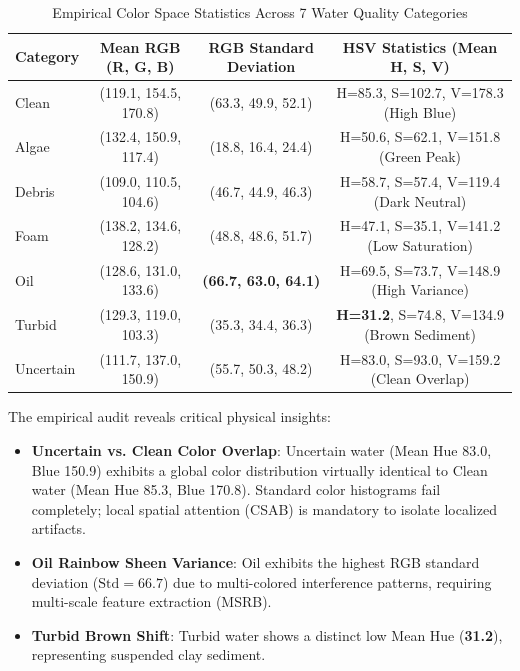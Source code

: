 \documentclass[journal]{IEEEtran}
\begin{document}
\begin{table}[!t]
\centering
\caption{Empirical Color Space Statistics Across 7 Water Quality Categories}
\label{tab:color_stats}
\begin{tabular}{lccc}
\toprule
\textbf{Category} & \textbf{Mean RGB (R, G, B)} & \textbf{RGB Standard Deviation} & \textbf{HSV Statistics (Mean H, S, V)} \\
\midrule
Clean & (119.1, 154.5, 170.8) & (63.3, 49.9, 52.1) & H=85.3, S=102.7, V=178.3 (High Blue) \\
Algae & (132.4, 150.9, 117.4) & (18.8, 16.4, 24.4) & H=50.6, S=62.1,  V=151.8 (Green Peak) \\
Debris & (109.0, 110.5, 104.6) & (46.7, 44.9, 46.3) & H=58.7, S=57.4,  V=119.4 (Dark Neutral) \\
Foam & (138.2, 134.6, 128.2) & (48.8, 48.6, 51.7) & H=47.1, S=35.1,  V=141.2 (Low Saturation) \\
Oil & (128.6, 131.0, 133.6) & \textbf{(66.7, 63.0, 64.1)} & H=69.5, S=73.7,  V=148.9 (High Variance) \\
Turbid & (129.3, 119.0, 103.3) & (35.3, 34.4, 36.3) & \textbf{H=31.2}, S=74.8,  V=134.9 (Brown Sediment) \\
Uncertain & (111.7, 137.0, 150.9) & (55.7, 50.3, 48.2) & H=83.0, S=93.0,  V=159.2 (Clean Overlap) \\
\bottomrule
\end{tabular}
\end{table}

The empirical audit reveals critical physical insights:
\begin{itemize}
    \item \textbf{\textsf{Uncertain} vs. \textsf{Clean} Color Overlap}: \textsf{Uncertain} water (Mean Hue 83.0, Blue 150.9) exhibits a global color distribution virtually identical to \textsf{Clean} water (Mean Hue 85.3, Blue 170.8). Standard color histograms fail completely; local spatial attention (CSAB) is mandatory to isolate localized artifacts.
    \item \textbf{\textsf{Oil} Rainbow Sheen Variance}: \textsf{Oil} exhibits the highest RGB standard deviation ($\text{Std} = 66.7$) due to multi-colored interference patterns, requiring multi-scale feature extraction (MSRB).
    \item \textbf{\textsf{Turbid} Brown Shift}: \textsf{Turbid} water shows a distinct low Mean Hue (\textbf{31.2}), representing suspended clay sediment.
\end{itemize}
\end{document}
